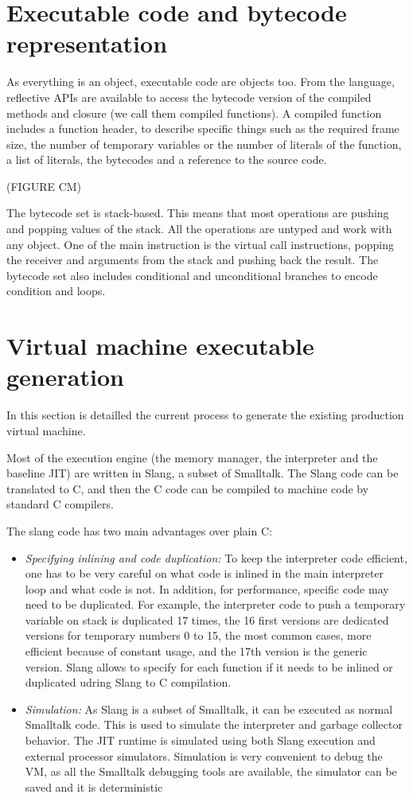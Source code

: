 \documentclass[a4paper,12pt,twoside]{../includes/ThesisStyle}
\begin{document}
\section{Executable code and bytecode representation}

As everything is an object, executable code are objects too. From the language, reflective APIs are available to access the bytecode version of the compiled methods and closure (we call them compiled functions). A compiled function includes a function header, to describe specific things such as the required frame size, the number of temporary variables or the number of literals of the function, a list of literals, the bytecodes and a reference to the source code. 

(FIGURE CM)

The bytecode set is stack-based. This means that most operations are pushing and popping values of the stack. All the operations are untyped and work with any object. One of the main instruction is the virtual call instructions, popping the receiver and arguments from the stack and pushing back the result. The bytecode set also includes conditional and unconditional branches to encode condition and loops.

\section{Virtual machine executable generation}

In this section is detailled the current process to generate the existing production virtual machine. 

Most of the execution engine (the memory manager, the interpreter and the baseline JIT) are written in Slang, a subset of Smalltalk. The Slang code can be translated to C, and then the C code can be compiled to machine code by standard C compilers.

The slang code has two main advantages over plain C:
\begin{itemize}
	\item \emph{Specifying inlining and code duplication:} To keep the interpreter code efficient, one has to be very careful on what code is inlined in the main interpreter loop and what code is not. In addition, for performance, specific code may need to be duplicated. For example, the interpreter code to push a temporary variable on stack is duplicated 17 times, the 16 first versions are dedicated versions for temporary numbers 0 to 15, the most common cases, more efficient because of constant usage, and the 17th version is the generic version. Slang allows to specify for each function if it needs to be inlined or duplicated udring Slang to C compilation.
	\item \emph{Simulation:} As Slang is a subset of Smalltalk, it can be executed as normal Smalltalk code. This is used to simulate the interpreter and garbage collector behavior. The JIT runtime is simulated using both Slang execution and external processor simulators. Simulation is very convenient to debug the VM, as all the Smalltalk debugging tools are available, the simulator can be saved and it is deterministic
\end{itemize}
\end{document}
